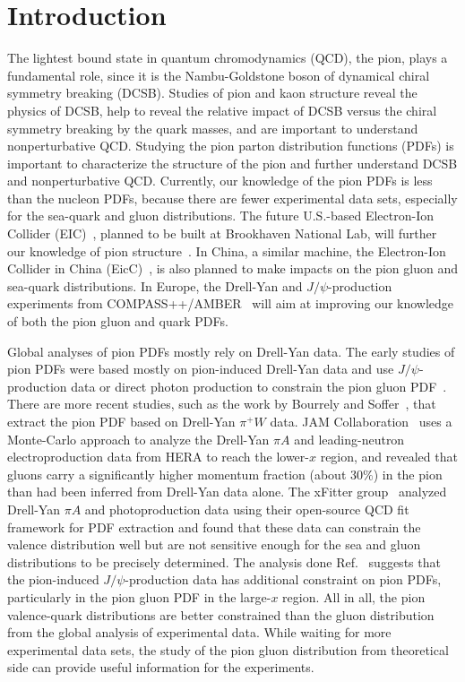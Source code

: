 \section{Introduction}

The lightest bound state in quantum chromodynamics (QCD), the pion, plays a fundamental role, since it is the Nambu-Goldstone boson of dynamical chiral symmetry breaking (DCSB).
Studies of pion and kaon structure reveal the physics of DCSB, help to reveal the relative impact of DCSB versus the chiral symmetry breaking by the quark masses, and are important to understand nonperturbative QCD.
Studying the pion parton distribution functions (PDFs) is important to characterize the structure of the pion and further understand DCSB and nonperturbative QCD.
Currently, our knowledge of the pion PDFs is less than the nucleon PDFs, because there are fewer experimental data sets, especially for the sea-quark and gluon distributions.
The future U.S.-based Electron-Ion Collider (EIC)~\cite{Accardi:2012qut}, planned to be built at Brookhaven National Lab, will further our knowledge of  pion structure~\cite{Arrington:2021biu,Aguilar:2019teb}.
%
In China, a similar machine, the Electron-Ion Collider in China (EicC)~\cite{Anderle:2021wcy}, is also planned to make impacts on the pion gluon and sea-quark distributions.
%
In Europe, the Drell-Yan and $J/\psi$-production experiments from COMPASS++/AMBER~\cite{Denisov:2018unj} will aim at improving our knowledge of both the pion gluon and quark PDFs.

Global analyses of pion PDFs mostly rely on Drell-Yan data.
The early studies of pion PDFs were based mostly on pion-induced Drell-Yan data and use $J/\psi$-production data or direct photon production to constrain the pion gluon PDF~\cite{Owens:1984zj,Aurenche:1989sx,Sutton:1991ay,Gluck:1991ey,Gluck:1999xe}.
There are more recent studies, such as the work by Bourrely and Soffer~\cite{Bourrely:2018yck}, that extract the pion PDF based on Drell-Yan $\pi^+W$ data.
JAM Collaboration~\cite{Barry:2018ort,Cao:2021aci} uses a Monte-Carlo approach to analyze the Drell-Yan $\pi A$ and leading-neutron electroproduction data from HERA to reach the lower-$x$ region, and revealed that gluons carry a significantly higher momentum fraction (about $30\%$) in the pion than had been inferred from Drell-Yan data alone.
The xFitter group~\cite{Novikov:2020snp} analyzed Drell-Yan $\pi A$ and photoproduction data using their open-source QCD fit framework for PDF extraction and found that these data can constrain the valence distribution well but are not sensitive enough for the sea and gluon distributions to be precisely determined.
The analysis done Ref.~\cite{Chang:2020rdy} suggests that the pion-induced $J/\psi$-production data has additional constraint on pion PDFs, particularly in the pion gluon PDF in the large-$x$ region.
All in all, the pion valence-quark distributions are better constrained
than the gluon distribution from the global analysis of experimental data.
While waiting for more experimental data sets, the study of the pion gluon distribution from theoretical side can provide useful information for the experiments.


